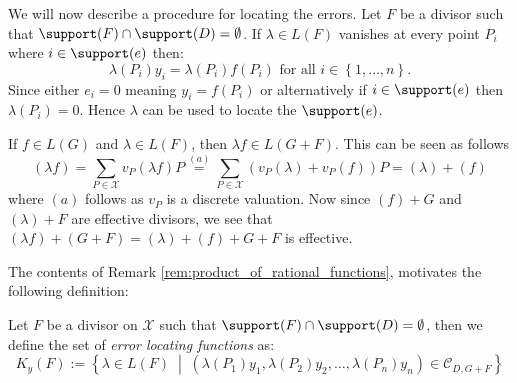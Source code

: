 We will now describe a procedure for locating the errors. Let $F$ be a divisor such that $\support(F) \cap \support(D) = \emptyset$. If $\lambda \in L(F)$ vanishes at every point $P_i$ where $i \in \support(e)$ then:
\begin{equation*}
  \lambda(P_{i})y_i = \lambda(P_i)f(P_i) \text{ for all } i \in \left\{1, \ldots, n\right\}.
\end{equation*}
Since either $e_{i} = 0$ meaning $y_i = f(P_i)$ or alternatively if $i \in \support(e)$ then $\lambda(P_{i}) = 0$. Hence $\lambda$ can be used to locate the $\support(e)$.

\begin{remark}\label{rem:product_of_rational_functions}
  If $f \in L(G)$ and $\lambda \in L(F)$, then $\lambda f \in L(G + F)$. This can be seen as follows
  \begin{equation*}
    (\lambda f) = \sum_{P \in \mathcal{X}} v_{P}(\lambda f) P \stackrel{(a)}{=}  \sum_{P \in \mathcal{X}} (v_P(\lambda) + v_{P}(f)) P = (\lambda) + (f)
  \end{equation*}
  where $(a)$ follows as $v_P$ is a discrete valuation. Now since $(f) + G$ and $(\lambda) + F$ are effective divisors, we see that $(\lambda f) + (G + F) = (\lambda) + (f) + G + F$ is effective.
\end{remark}
The contents of Remark \ref{rem:product_of_rational_functions}, motivates the following definition:
\begin{definition}
Let $F$ be a divisor on $\mathcal{X}$ such that $\support(F) \cap \support(D) = \emptyset$, then we define the set of \textit{error locating functions} as:
\begin{equation*}
  K_y(F) := \left\{\lambda \in L(F) \; \middle| \; (\lambda(P_{1})y_{1}, \lambda(P_{2})y_{2}, \ldots, \lambda(P_{n})y_{n}) \in \mathcal{C}_{D, G + F}\right\}
\end{equation*}
\end{definition}

